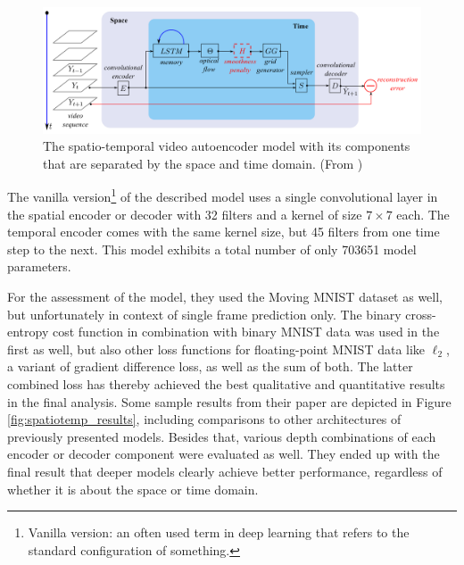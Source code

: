 \begin{figure}[htb]
	\centering
	\includegraphics[width=0.9\linewidth]{figures/related/spat_temp_video.png} 
	\caption[Spatio-Temporal Video Autoencoder Model]{The spatio-temporal video autoencoder model with its components that are separated by the space and time domain. (From \parencite{spat_temp_video_autoenc})} \label{fig:spatiotemp_model}
\end{figure}

The vanilla version\footnote{Vanilla version: an often used term in deep learning that refers to the standard configuration of something.} of the described model uses a single convolutional layer in the spatial encoder or decoder with \num{32} filters and a kernel of size $7 \times 7$ each. The temporal encoder comes with the same kernel size, but \num{45} filters from one time step to the next. This model exhibits a total number of only \num{703651} model parameters. 

For the assessment of the model, they used the Moving MNIST dataset as well, but unfortunately in context of single frame prediction only. The binary cross-entropy cost function in combination with binary MNIST data was used in the first as well, but also other loss functions for floating-point MNIST data like $\ell_2$, a variant of gradient difference loss, as well as the sum of both. The latter combined loss has thereby achieved the best qualitative and quantitative results in the final analysis. Some sample results from their paper are depicted in Figure \ref{fig:spatiotemp_results}, including comparisons to other architectures of previously presented models. Besides that, various depth combinations of each encoder or decoder component were evaluated as well. They ended up with the final result that deeper models clearly achieve better performance, regardless of whether it is about the space or time domain.

